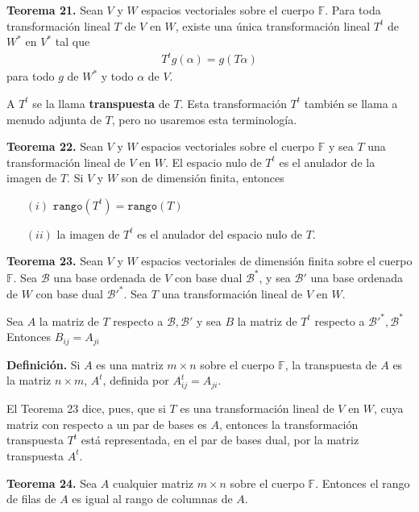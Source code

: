 \newpage
\textbf{Teorema 21.} Sean $V$ y $W$ espacios vectoriales sobre el 
cuerpo $\mathbb{F}$. Para toda transformación lineal $T$ de $V$
en $W$, existe una única transformación lineal $T^{t}$ de $W^{\ast}$
en $V^{\ast}$ tal que
\begin{align*}
T^{t}g(\alpha) = g(T\alpha)
\end{align*}
para todo $g$ de $W^{\ast}$ y todo $\alpha$ de $V$.

A $T^{t}$ se la llama \textbf{transpuesta} de $T$. Esta transformación
$T^{t}$ también se llama a menudo adjunta de $T$, pero no usaremos
esta terminología.

\textbf{Teorema 22.} Sean $V$ y $W$ espacios vectoriales sobre
el cuerpo $\mathbb{F}$ y sea $T$ una transformación lineal de
$V$ en $W$. El espacio nulo de $T^{t}$ es el anulador de la imagen
de $T$. Si $V$ y $W$ son de dimensión finita, entonces
\begin{itemize}
    \item[$(i)$] $\mathtt{rango} (T^{t}) = \mathtt{rango} (T)$
    \item[$(ii)$] la imagen de $T^{t}$ es el anulador del espacio
    nulo de $T$.
\end{itemize}
\textbf{Teorema 23.} Sean $V$ y $W$ espacios vectoriales de dimensión
finita sobre el cuerpo $\mathbb{F}$. Sea $\mathcal{B}$ una base ordenada
de $V$ con base dual $\mathcal{B}^{\ast}$, y sea $\mathcal{B}'$ una base
ordenada de $W$ con base dual $\mathcal{B}'^{\ast}$. Sea $T$ una
transformación lineal de $V$ en $W$.

Sea $A$ la matriz de $T$ respecto a $\mathcal{B}, \mathcal{B}'$  y sea
$B$ la matriz de $T^{t}$ respecto a $\mathcal{B}'^{\ast},\mathcal{B}^{\ast}$
Entonces $B_{ij}=A_{ji}$

\textbf{Definición.} Si $A$ es una matriz $m\times n$ sobre el cuerpo
$\mathbb{F}$, la transpuesta de $A$ es la matriz $n\times m$,
$A^{t}$, definida por $A^{t}_{ij} = A_{ji}$.

El Teorema 23 dice, pues, que si $T$ es una transformación lineal de
$V$ en $W$, cuya matriz con respecto a un par de bases es $A$, entonces
la transformación transpuesta $T^{t}$ está representada, en el par de
bases dual, por la matriz transpuesta $A^{t}$.

\textbf{Teorema 24.} Sea $A$ cualquier matriz $m\times n$ sobre el
cuerpo $\mathbb{F}$. Entonces el rango de filas de $A$ es igual al
rango de columnas de $A$.